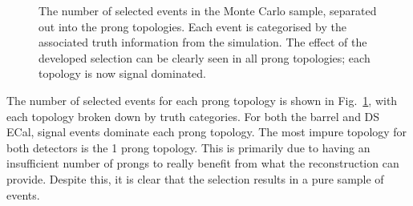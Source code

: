 \begin{figure}
  \centering
  \caption{The number of selected events in the Monte Carlo sample, separated out into the prong topologies.  Each event is categorised by the associated truth information from the simulation.  The effect of the developed selection can be clearly seen in all prong topologies; each topology is now signal dominated.}
  \label{fig:ProngStackSelected}
\end{figure}
The number of selected events for each prong topology is shown in Fig.~\ref{fig:ProngStackSelected}, with each topology broken down by truth categories.  For both the barrel and DS ECal, signal events dominate each prong topology.  The most impure topology for both detectors is the 1 prong topology.  This is primarily due to having an insufficient number of prongs to really benefit from what the reconstruction can provide.  Despite this, it is clear that the selection results in a pure sample of events.  
\newline
